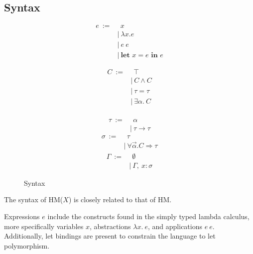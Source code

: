 \documentclass[runningheads]{llncs}
\newcommand{\hmx}{HM($X$)}
\newcommand{\kwlet}{\textbf{let }}
\newcommand{\kwin}{\textbf{ in }}
\begin{document}
\subsection{Syntax}
\begin{figure}[t]
  \centering
  \begin{subfigure}[t]{0.3\textwidth}
    \begin{align*}
      e \ := & \ \ x                    \\
             & | \ λx. e                \\
             & | \ e \ e                \\
             & | \ \kwlet x = e \kwin e
    \end{align*}
  \end{subfigure}
  \begin{subfigure}[t]{0.3\textwidth}
    \begin{align*}
      C \ := & \ \ ⊤       \\
             & | \ C ∧ C   \\
             & | \ τ = τ   \\
             & | \ ∃α. \ C \\
    \end{align*}
  \end{subfigure}
  \begin{subfigure}[t]{0.3\textwidth}
    \begin{align*}
      τ \ := & \ \ α     \\
             & | \ τ → τ
    \end{align*}
    \begin{align*}
      σ \ := & \ \ τ             \\
             & | \ ∀\Vec α.C ⇒ τ
    \end{align*}
    \begin{align*}
      Γ \ := & \ \ ∅           \\
             & | \ Γ , \ x : σ
    \end{align*}
  \end{subfigure}
  \caption{Syntax}
\end{figure}

The syntax of \hmx{} is closely related to that of HM.

Expressions $e$ include the constructs found in the simply typed lambda
calculus, more specifically variables $x$, abstractions $λx. \ e$, and
applications $e \
  e$.
Additionally, let bindings are present to constrain the language to let
polymorphism.
\end{document}
